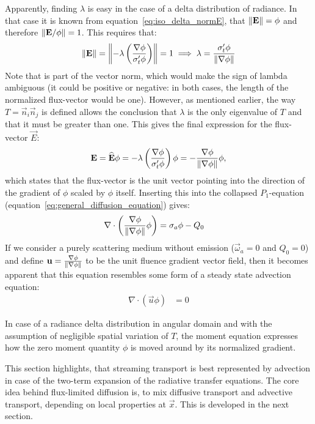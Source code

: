 Apparently, finding $\lambda$ is easy in the case of a delta distribution of radiance. In that case it is known from equation~\ref{eq:iso_delta_normE}, that $\left\lVert\boldsymbol{\mathbf{E}}\right\rVert=\phi$ and therefore $\left\lVert\boldsymbol{\mathbf{E}}/\phi\right\rVert=1$. This requires that:
\begin{align*}
\left\lVert\boldsymbol{\mathbf{E}}\right\rVert
=
\left\lVert-\lambda\left(\frac{\nabla\phi}{\sigma_t'\phi}\right )\right\rVert=1
\implies
\lambda=\frac{\sigma_t'\phi}{\left\lVert\nabla\phi\right\rVert}
\end{align*}
Note that is part of the vector norm, which would make the sign of lambda ambiguous (it could be positive or negative: in both cases, the length of the normalized flux-vector would be one). However, as mentioned earlier, the way $T=\vec{n}_i\vec{n}_j$ is defined allows the conclusion that $\lambda$ is the only eigenvalue of $T$ and that it must be greater than one. This gives the final expression for the flux-vector $\vec{E}$:
\begin{align*}
\boldsymbol{\mathbf{E}}=\widehat{\boldsymbol{\mathbf{E}}}\phi= -\lambda\left(\frac{\nabla\phi}{\sigma_t'\phi}\right )\phi= -\frac{\nabla\phi}{\left\lVert\nabla\phi\right\rVert}\phi
,
\end{align*}
which states that the flux-vector is the unit vector pointing into the direction of the gradient of $\phi$ scaled by $\phi$ itself. Inserting this into the collapsed $P_1$-equation (equation~\ref{eq:general_diffusion_equation}) gives:
\begin{align}
\label{eq:iso_delta_advection_equation}
\nabla\cdot\left(\frac{\nabla\phi}{\left\lVert\nabla\phi\right\rVert}\phi\right) &= \sigma_a\phi - Q_0
\end{align}
If we consider a purely scattering medium without emission ($\vec{\omega}_a=0$ and $Q_0=0$) and define $\boldsymbol{\mathbf{u}}=\frac{\nabla\phi}{\left\lVert\nabla\phi\right\rVert}$ to be the unit fluence gradient vector field, then it becomes apparent that this equation resembles some form of a steady state advection equation:
\begin{align}
\label{eq:iso_delta_advection_equation2}
\nabla\cdot\left(\vec{u}\phi\right) &= 0
\end{align}

In case of a radiance delta distribution in angular domain and with the assumption of negligible spatial variation of $T$, the moment equation expresses how the zero moment quantity $\phi$ is moved around by its normalized gradient.

This section highlights, that streaming transport is best represented by advection in case of the two-term expansion of the radiative transfer equations. The core idea behind flux-limited diffusion is, to mix diffusive transport and advective transport, depending on local properties at $\vec{x}$. This is developed in the next section.